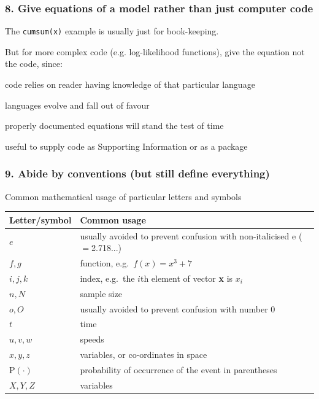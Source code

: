 \begin{frame}
\frametitle{8. Give equations of a model rather than just computer code}

The {\tt cumsum(x)} example is usually just for book-keeping.

\medskip

But for more complex code (e.g. log-likelihood functions), give the equation not
the code, since:
\bi
\item code relies on reader having knowledge of that particular language
\item languages evolve and fall out of favour
\item properly documented equations will stand the test of time
\item useful to supply code as Supporting Information or as a package
\ei

\end{frame}


\begin{frame}
\frametitle{9. Abide by conventions (but still define everything)}

\centering Common mathematical usage of particular letters and symbols
\begin{table}
  \centering{}
  \begin{tabular}{ll}
\hline
Letter/symbol & Common usage\\
\hline
$e$ & usually avoided to prevent confusion with non-italicised e ($=$2.718...)\\
$f, g$ & function, e.g.~$f(x) = x^3 + 7$\\
$i, j, k$ & index, e.g.~the $i$th element of vector {\bf x} is $x_i$\\
$n, N$ & sample size\\
$o, O$ & usually avoided to prevent confusion with number 0\\
$t$ & time\\
$u, v, w$ & speeds\\
$x, y, z$ & variables, or co-ordinates in space\\
\mbox{P}$(\cdot)$ & probability of occurrence of the event in parentheses\\
$X, Y, Z$ & variables\\
\hline
\end{tabular}
\end{table}

\end{frame}

